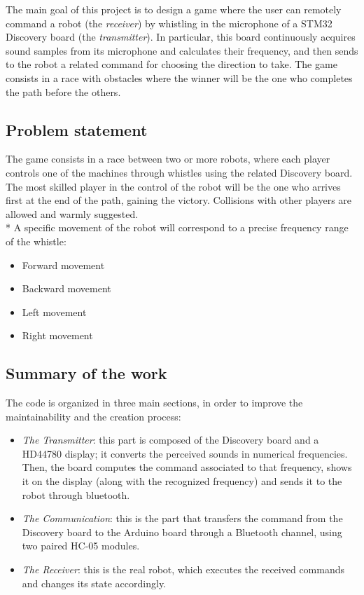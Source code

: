 The main goal of this project is to design a game where the user can remotely command a robot (the \textit{receiver}) by whistling in the microphone of a STM32 Discovery board (the \textit{transmitter}). In particular, this board continuously acquires sound samples from its microphone and calculates their frequency, and then sends to the robot a related command for choosing the direction to take. The game consists in a race with obstacles where the winner will be the one who completes the path before the others.

\subsection{Problem statement}
The game consists in a race between two or more robots, where each player controls one of the machines through whistles using the related Discovery board. The most skilled player in the control of the robot will be the one who arrives first at the end of the path, gaining the victory. Collisions with other players are allowed and warmly suggested.\\*
A specific movement of the robot will correspond to a precise frequency range of the whistle:
\begin{itemize}
	\item Forward movement
	\item Backward movement
	\item Left movement
	\item Right movement
\end{itemize}

\subsection{Summary of the work}
The code is organized in three main sections, in order to improve the maintainability and the creation process:
\begin{itemize}
	\item \textit{The Transmitter}: this part is composed of the Discovery board and a HD44780 display; it converts the perceived sounds in numerical frequencies. Then, the board computes the command associated to that frequency, shows it on the display (along with the recognized frequency) and sends it to the robot through bluetooth.
	\item \textit{The Communication}: this is the part that transfers the command from the Discovery board to the Arduino board through a Bluetooth channel, using two paired HC-05 modules.
	\item \textit{The Receiver}: this is the real robot, which executes the received commands and changes its state accordingly.
\end{itemize}